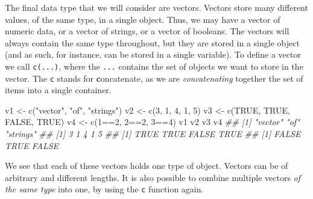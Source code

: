 \documentclass[
  letterpaper,
  DIV=11,
  numbers=noendperiod]{scrreprt}
\newenvironment{Shaded}{\begin{snugshade}}{\end{snugshade}}
\newcommand{\ConstantTok}[1]{\textcolor[rgb]{0.56,0.35,0.01}{#1}}
\newcommand{\DecValTok}[1]{\textcolor[rgb]{0.68,0.00,0.00}{#1}}
\newcommand{\DocumentationTok}[1]{\textcolor[rgb]{0.37,0.37,0.37}{\textit{#1}}}
\newcommand{\FunctionTok}[1]{\textcolor[rgb]{0.28,0.35,0.67}{#1}}
\newcommand{\NormalTok}[1]{\textcolor[rgb]{0.00,0.23,0.31}{#1}}
\newcommand{\OtherTok}[1]{\textcolor[rgb]{0.00,0.23,0.31}{#1}}
\newcommand{\SpecialCharTok}[1]{\textcolor[rgb]{0.37,0.37,0.37}{#1}}
\newcommand{\StringTok}[1]{\textcolor[rgb]{0.13,0.47,0.30}{#1}}
\theoremstyle{definition}
\theoremstyle{definition}
\theoremstyle{definition}
\theoremstyle{remark}
\begin{document}
The final data type that we will consider are vectors. Vectors store
many different values, of the same type, in a single object. Thus, we
may have a vector of numeric data, or a vector of strings, or a vector
of booleans. The vectors will always contain the same type throughout,
but they are stored in a single object (and as such, for instance, can
be stored in a single variable). To define a vector we call
\texttt{c(...)}, where the \texttt{...} contains the set of objects we
want to store in the vector. The \texttt{c} stands for
\textbf{c}oncatenate, as we are \emph{concatenating} together the set of
items into a single container.

\begin{Shaded}
\begin{Highlighting}[]
\NormalTok{v1 }\OtherTok{\textless{}{-}} \FunctionTok{c}\NormalTok{(}\StringTok{"vector"}\NormalTok{, }\StringTok{"of"}\NormalTok{, }\StringTok{"strings"}\NormalTok{)}
\NormalTok{v2 }\OtherTok{\textless{}{-}} \FunctionTok{c}\NormalTok{(}\DecValTok{3}\NormalTok{, }\DecValTok{1}\NormalTok{, }\DecValTok{4}\NormalTok{, }\DecValTok{1}\NormalTok{, }\DecValTok{5}\NormalTok{)}
\NormalTok{v3 }\OtherTok{\textless{}{-}} \FunctionTok{c}\NormalTok{(}\ConstantTok{TRUE}\NormalTok{, }\ConstantTok{TRUE}\NormalTok{, }\ConstantTok{FALSE}\NormalTok{, }\ConstantTok{TRUE}\NormalTok{)}
\NormalTok{v4 }\OtherTok{\textless{}{-}} \FunctionTok{c}\NormalTok{(}\DecValTok{1}\SpecialCharTok{==}\DecValTok{2}\NormalTok{, }\DecValTok{2}\SpecialCharTok{==}\DecValTok{2}\NormalTok{, }\DecValTok{3}\SpecialCharTok{==}\DecValTok{4}\NormalTok{)}
\NormalTok{v1}
\NormalTok{v2}
\NormalTok{v3}
\NormalTok{v4}
\DocumentationTok{\#\# [1] "vector"  "of"      "strings"}
\DocumentationTok{\#\# [1] 3 1 4 1 5}
\DocumentationTok{\#\# [1]  TRUE  TRUE FALSE  TRUE}
\DocumentationTok{\#\# [1] FALSE  TRUE FALSE}
\end{Highlighting}
\end{Shaded}

We see that each of these vectors holds one type of object. Vectors can
be of arbitrary and different lengths. It is also possible to combine
multiple vectors \emph{of the same type} into one, by using the
\texttt{c} function again.
\end{document}
